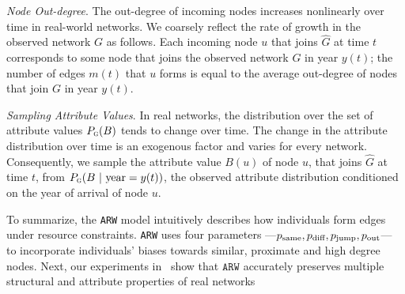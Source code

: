 \textit{Node Out-degree}.
The out-degree of incoming nodes increases  nonlinearly over time in real-world networks.
We coarsely reflect the rate of growth in the observed network $G$ as follows.
Each incoming node $u$ that joins $\hat{G}$ at time $t$ corresponds to some
node that joins the observed network $G$ in year $y(t)$; the number of edges $m(t)$
that $u$ forms is equal to the average out-degree of nodes that join $G$ in year $y(t)$.

\textit{Sampling Attribute Values}.
In real networks, the distribution over the set of attribute values $P_{\textsc{g}}(B)$ tends to change over time.
The change in the attribute distribution over time is an exogenous factor and varies for every network.
Consequently, we sample the attribute value $B(u)$ of node $u$, that joins $\hat{G}$ at time
$t$, from $P_{\textsc{g}}(B{\mbox{ | year}=y(t)})$, the observed attribute
distribution conditioned on the year of arrival of node $u$.

To summarize, the \texttt{ARW} model
intuitively describes how individuals form edges under resource constraints.
\texttt{ARW} uses four parameters ---$p_{\scriptsize\mbox{same}}, p_{\scriptsize\mbox{diff}}, p_{\scriptsize\mbox{jump}}, p_{\scriptsize\mbox{out}}$--- to incorporate
individuals' biases towards similar, proximate and high degree nodes.
Next, our experiments in~ show that $\texttt{ARW}$ accurately preserves
{multiple} structural and attribute properties of real networks

